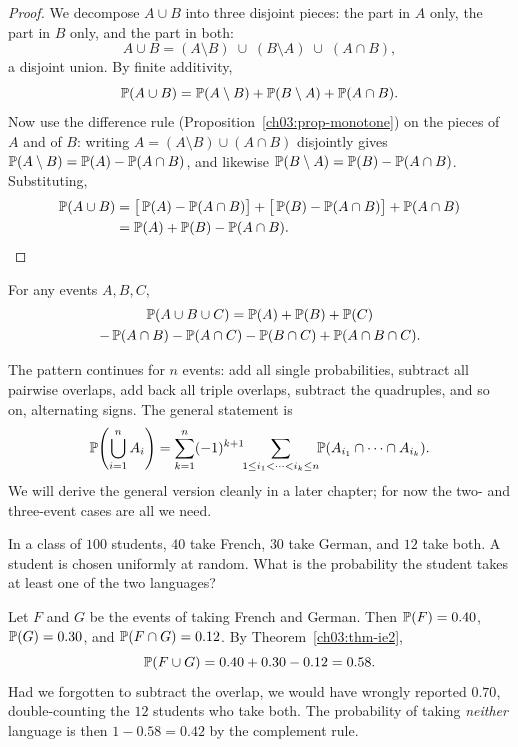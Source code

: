 \begin{proof}
We decompose $A \cup B$ into three disjoint pieces: the part in $A$ only, the
part in $B$ only, and the part in both:
\[
A \cup B = (A \setminus B) \;\cup\; (B \setminus A) \;\cup\; (A \cap B),
\]
a disjoint union. By finite additivity,
\[
\P(A \cup B) = \P(A \setminus B) + \P(B \setminus A) + \P(A \cap B).
\]
Now use the difference rule (Proposition~\ref{ch03:prop-monotone}) on the pieces of
$A$ and of $B$: writing $A = (A\setminus B) \cup (A \cap B)$ disjointly gives
$\P(A \setminus B) = \P(A) - \P(A \cap B)$, and likewise
$\P(B \setminus A) = \P(B) - \P(A \cap B)$. Substituting,
\begin{align*}
\P(A \cup B) &= \big[\P(A) - \P(A\cap B)\big] + \big[\P(B) - \P(A\cap B)\big] + \P(A \cap B) \\
&= \P(A) + \P(B) - \P(A \cap B). \qedhere
\end{align*}
\end{proof}

\begin{theorem}
\label{ch03:thm-ie3}
For any events $A, B, C$,
\begin{multline*}
\P(A \cup B \cup C) = \P(A) + \P(B) + \P(C) \\
- \P(A\cap B) - \P(A \cap C) - \P(B \cap C) + \P(A \cap B \cap C).
\end{multline*}
\end{theorem}

The pattern continues for $n$ events: add all single probabilities, subtract all
pairwise overlaps, add back all triple overlaps, subtract the quadruples, and so
on, alternating signs. The general statement is
\[
\P\!\left(\bigcup_{i=1}^n A_i\right) = \sum_{k=1}^{n} (-1)^{k+1}
\!\!\sum_{1 \le i_1 < \cdots < i_k \le n}\!\! \P(A_{i_1} \cap \cdots \cap A_{i_k}).
\]
We will derive the general version cleanly in a later chapter; for now the two- and
three-event cases are all we need.

\begin{example}
\label{ch03:ex-ie}
In a class of $100$ students, $40$ take French, $30$ take German, and $12$ take
both. A student is chosen uniformly at random. What is the probability the
student takes at least one of the two languages?

Let $F$ and $G$ be the events of taking French and German. Then $\P(F) = 0.40$,
$\P(G) = 0.30$, and $\P(F \cap G) = 0.12$. By Theorem~\ref{ch03:thm-ie2},
\[
\P(F \cup G) = 0.40 + 0.30 - 0.12 = 0.58.
\]
Had we forgotten to subtract the overlap, we would have wrongly reported
$0.70$, double-counting the $12$ students who take both. The probability of
taking \emph{neither} language is then $1 - 0.58 = 0.42$ by the complement rule.
\end{example}

